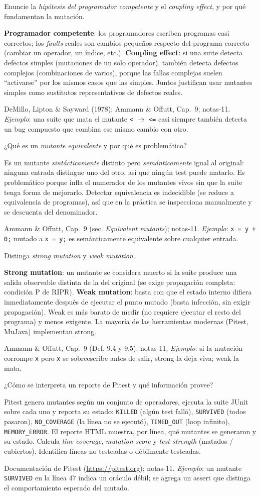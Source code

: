 \documentclass[11pt,a4paper]{article}
\newcounter{preg}
\newcommand{\qa}[3]{%
  \stepcounter{preg}%
  \vspace{0.4em}
  \begin{preguntabox}{\thepreg}
  #1
  \end{preguntabox}
  \begin{respuestabox}
  #2
  \end{respuestabox}
  \begin{refbox}
  #3
  \end{refbox}
  \vspace{0.6em}
}
\begin{document}
\qa{Enuncie la \emph{hipótesis del programador competente} y el \emph{coupling effect}, y por qué fundamentan la mutación.}
{\textbf{Programador competente}: los programadores escriben programas casi correctos; los \emph{faults} reales son cambios pequeños respecto del programa correcto (cambiar un operador, un índice, etc.). \textbf{Coupling effect}: si una suite detecta defectos simples (mutaciones de un solo operador), también detecta defectos complejos (combinaciones de varios), porque las fallas complejas suelen ``activarse'' por los mismos casos que las simples. Juntos justifican usar mutantes simples como sustitutos representativos de defectos reales.}
{DeMillo, Lipton \& Sayward (1978); Ammann \& Offutt, Cap.~9; notas-11. \emph{Ejemplo}: una suite que mata el mutante \texttt{<} $\to$ \texttt{<=} casi siempre también detecta un bug compuesto que combina ese mismo cambio con otro.}

\qa{¿Qué es un \emph{mutante equivalente} y por qué es problemático?}
{Es un mutante \emph{sintácticamente} distinto pero \emph{semánticamente} igual al original: ninguna entrada distingue uno del otro, así que ningún test puede matarlo. Es problemático porque infla el numerador de los mutantes vivos sin que la suite tenga forma de mejorarlo. Detectar equivalencia es indecidible (se reduce a equivalencia de programas), así que en la práctica se inspecciona manualmente y se descuenta del denominador.}
{Ammann \& Offutt, Cap.~9 (sec. \emph{Equivalent mutants}); notas-11. \emph{Ejemplo}: \texttt{x = y + 0;} mutado a \texttt{x = y;} es semánticamente equivalente sobre cualquier entrada.}

\qa{Distinga \emph{strong mutation} y \emph{weak mutation}.}
{\textbf{Strong mutation}: un mutante se considera muerto si la suite produce una salida observable distinta de la del original (se exige propagación completa: condición P de RIPR). \textbf{Weak mutation}: basta con que el estado interno difiera inmediatamente después de ejecutar el punto mutado (basta infección, sin exigir propagación). Weak es más barato de medir (no requiere ejecutar el resto del programa) y menos exigente. La mayoría de las herramientas modernas (Pitest, MuJava) implementan strong.}
{Ammann \& Offutt, Cap.~9 (Def. 9.4 y 9.5); notas-11. \emph{Ejemplo}: si la mutación corrompe \texttt{x} pero \texttt{x} se sobreescribe antes de salir, strong la deja viva; weak la mata.}

\qa{¿Cómo se interpreta un reporte de Pitest y qué información provee?}
{Pitest genera mutantes según un conjunto de operadores, ejecuta la suite JUnit sobre cada uno y reporta su estado: \texttt{KILLED} (algún test falló), \texttt{SURVIVED} (todos pasaron), \texttt{NO\_COVERAGE} (la línea no se ejecutó), \texttt{TIMED\_OUT} (loop infinito), \texttt{MEMORY\_ERROR}. El reporte HTML muestra, por línea, qué mutantes se generaron y su estado. Calcula \emph{line coverage}, \emph{mutation score} y \emph{test strength} (matados / cubiertos). Identifica líneas no testeadas o débilmente testeadas.}
{Documentación de Pitest (\url{https://pitest.org}); notas-11. \emph{Ejemplo}: un mutante \texttt{SURVIVED} en la línea 47 indica un oráculo débil; se agrega un assert que distinga el comportamiento esperado del mutado.}
\end{document}
